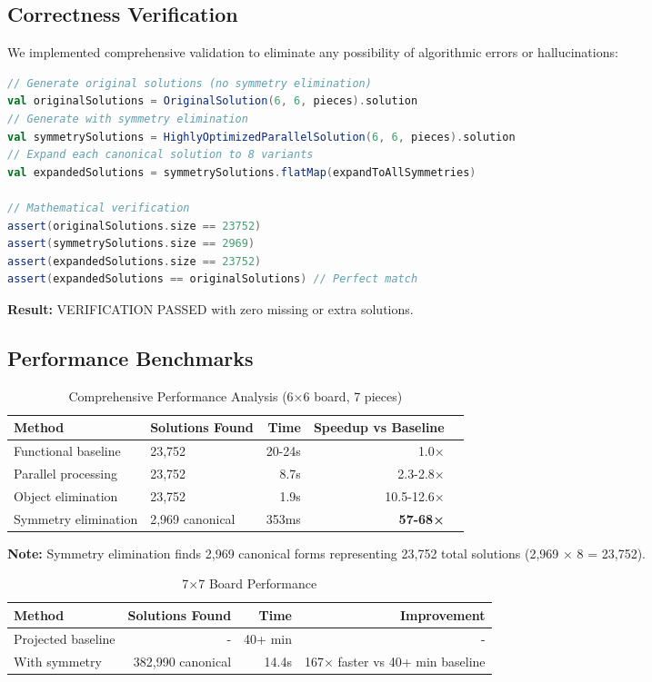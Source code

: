 \documentclass[12pt,a4paper]{article}
\theoremstyle{definition}
\begin{document}
\subsection{Correctness Verification}

We implemented comprehensive validation to eliminate any possibility of algorithmic errors or hallucinations:

\begin{lstlisting}[language=Scala, caption=Symmetry Verification Test]
// Generate original solutions (no symmetry elimination)
val originalSolutions = OriginalSolution(6, 6, pieces).solution
// Generate with symmetry elimination  
val symmetrySolutions = HighlyOptimizedParallelSolution(6, 6, pieces).solution
// Expand each canonical solution to 8 variants
val expandedSolutions = symmetrySolutions.flatMap(expandToAllSymmetries)

// Mathematical verification
assert(originalSolutions.size == 23752)
assert(symmetrySolutions.size == 2969) 
assert(expandedSolutions.size == 23752)
assert(expandedSolutions == originalSolutions) // Perfect match
\end{lstlisting}

\textbf{Result:} VERIFICATION PASSED with zero missing or extra solutions.

\subsection{Performance Benchmarks}

\begin{table}[h]
\centering
\caption{Comprehensive Performance Analysis (6$\times$6 board, 7 pieces)}
\begin{tabular}{@{}llrrr@{}}
\toprule
Method & Solutions Found & Time & Speedup vs Baseline \\
\midrule
Functional baseline & 23,752 & 20-24s & 1.0× \\
Parallel processing & 23,752 & 8.7s & 2.3-2.8× \\
Object elimination & 23,752 & 1.9s & 10.5-12.6× \\
Symmetry elimination & 2,969 canonical & 353ms & \textbf{57-68×} \\
\bottomrule
\end{tabular}
\end{table}

\textbf{Note:} Symmetry elimination finds 2,969 canonical forms representing 23,752 total solutions (2,969 × 8 = 23,752).

\begin{table}[h]
\centering
\caption{7$\times$7 Board Performance}
\begin{tabular}{@{}lrrr@{}}
\toprule
Method & Solutions Found & Time & Improvement \\
\midrule
Projected baseline & - & 40+ min & - \\
With symmetry & 382,990 canonical & 14.4s & 167× faster vs 40+ min baseline \\
\bottomrule
\end{tabular}
\end{table}
\end{document}
